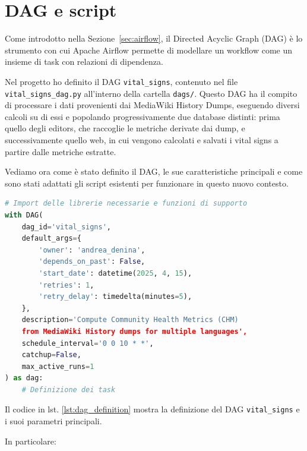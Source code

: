 \section{DAG e script}
\label{sec:dag_script}

Come introdotto nella Sezione~\ref{sec:airflow}, il Directed Acyclic Graph (DAG) è lo strumento con cui Apache Airflow permette di modellare un workflow come un insieme di task con relazioni di dipendenza.

Nel progetto ho definito il DAG \texttt{vital\_signs}, contenuto nel file \texttt{vital\_signs\_dag.py} all’interno della cartella \texttt{dags/}. Questo DAG ha il compito di processare i dati provenienti dai MediaWiki History Dumps, eseguendo diversi calcoli su di essi e popolando progressivamente due database distinti: prima quello degli editors, che raccoglie le metriche derivate dai dump, e successivamente quello web, in cui vengono calcolati e salvati i vital signs a partire dalle metriche estratte.

Vediamo ora come è stato definito il DAG, le sue caratteristiche principali e come sono stati adattati gli script esistenti per funzionare in questo nuovo contesto.


\begin{lstlisting}[language=Python, caption=Definizione del DAG in Airflow, label=lst:dag_definition, basicstyle=\scriptsize\ttfamily]
# Import delle librerie necessarie e funzioni di supporto
with DAG(
    dag_id='vital_signs',
    default_args={
        'owner': 'andrea_denina',
        'depends_on_past': False,
        'start_date': datetime(2025, 4, 15),
        'retries': 1,
        'retry_delay': timedelta(minutes=5),
    },
    description='Compute Community Health Metrics (CHM) 
    from MediaWiki History dumps for multiple languages',
    schedule_interval='0 0 10 * *',
    catchup=False,
    max_active_runs=1
) as dag:
    # Definizione dei task
\end{lstlisting}

Il codice in lst. \ref{lst:dag_definition} mostra la definizione del DAG \texttt{vital\_signs} e i suoi parametri principali.

In particolare:

